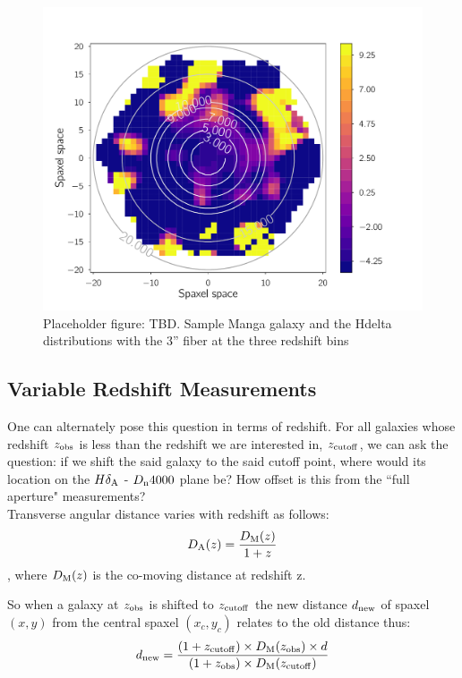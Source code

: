 \begin{figure}
\includegraphics[width=\textwidth]{figures/gal_aperture.pdf}
\caption[Placeholder figure: TBD. Sample Manga galaxy and the Hdelta distributions with the 3'' fiber at the three redshift bins]
{Placeholder figure: TBD. Sample Manga galaxy and the Hdelta distributions with the 3'' fiber at the three redshift bins
\label{fig:sample_manga}}
\end{figure}

\subsection{Variable Redshift Measurements}
One can alternately pose this question in terms of redshift. For all galaxies whose redshift $z_{\rm obs}$ is less than the redshift we are interested in, $z_{\rm cutoff}$, we can ask the question: if we shift the said galaxy to the said cutoff point, where would its location on the $H\delta_{\rm A}$ - $D_{\rm n}4000$ plane be? How offset is this from the ``full aperture" measurements?\\

Transverse angular distance varies with redshift as follows:
$$D_{\rm A}(z) = \frac{D_{\rm M}(z)}{1+z} $$,
where $D_{\rm M}(z)$ is the co-moving distance at redshift z.

So when a galaxy at $z_{\rm obs}$ is shifted to $z_{\rm cutoff}$ the new distance $d_{\rm new}$ of spaxel $(x,y)$ from the central spaxel $(x_{c},y_{c})$ relates to the old distance thus:
$$ d_{\rm new} = \frac{(1+z_{\rm cutoff})\times D_{\rm M}(z_{\rm obs}) \times d}{(1+z_{\rm obs}) \times  D_{\rm M}(z_{\rm cutoff})} $$

